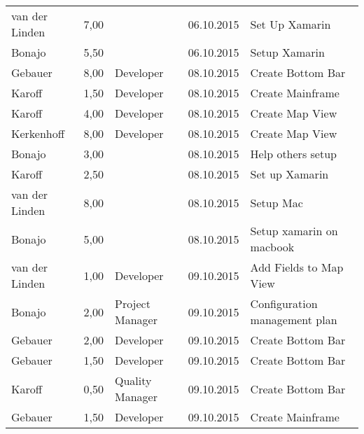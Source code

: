 \begin{longtable}{ l r p{2cm} c p{4cm} }
		van der Linden          & 7,00           &                 & 06.10.2015    & Set Up Xamarin                               \\
		Bonajo                  & 5,50           &                 & 06.10.2015    & Setup Xamarin                                \\
		Gebauer                 & 8,00           & Developer       & 08.10.2015    & Create Bottom Bar                            \\
		Karoff                  & 1,50           & Developer       & 08.10.2015    & Create Mainframe                             \\
		Karoff                  & 4,00           & Developer       & 08.10.2015    & Create Map View                              \\
		Kerkenhoff              & 8,00           & Developer       & 08.10.2015    & Create Map View                              \\
		Bonajo                  & 3,00           &                 & 08.10.2015    & Help others setup                            \\
		Karoff                  & 2,50           &                 & 08.10.2015    & Set up Xamarin                               \\
		van der Linden          & 8,00           &                 & 08.10.2015    & Setup Mac                                    \\
		Bonajo                  & 5,00           &                 & 08.10.2015    & Setup xamarin on macbook                     \\
		van der Linden          & 1,00           & Developer       & 09.10.2015    & Add Fields to Map View                       \\
		Bonajo                  & 2,00           & Project Manager & 09.10.2015    & Configuration management plan                \\
		Gebauer                 & 2,00           & Developer       & 09.10.2015    & Create Bottom Bar                            \\
		Gebauer                 & 1,50           & Developer       & 09.10.2015    & Create Bottom Bar                            \\
		Karoff                  & 0,50           & Quality Manager & 09.10.2015    & Create Bottom Bar                            \\
		Gebauer                 & 1,50           & Developer       & 09.10.2015    & Create Mainframe                             \\

\end{longtable}
